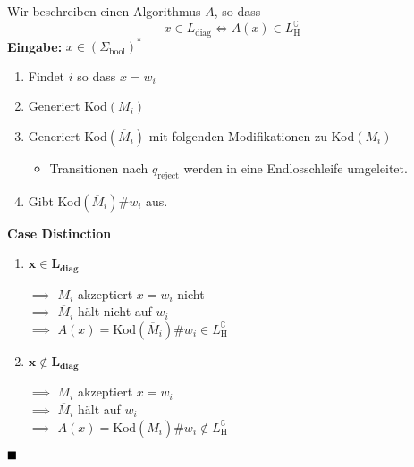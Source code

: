                 
                
                    Wir beschreiben einen Algorithmus $A$, so dass 
                    $$x \in L_{\text{diag}} \iff A(x) \in L_{\text{H}}^\complement$$
                    \textbf{Eingabe:} $x \in (\Sigma_{\text{bool}})^*$
                    
                    \begin{enumerate}[label=\arabic*.]
                        \item Findet $i$ so dass $x = w_i$
                        \item Generiert Kod$(M_i)$
                        \item Generiert Kod$(\overline{M}_i)$ mit folgenden Modifikationen zu Kod$(M_i)$
                        
                        \begin{itemize}[label=-]
                            \item Transitionen nach $q_{\text{reject}}$ werden in eine Endlosschleife umgeleitet.
                        \end{itemize}
                        \item Gibt Kod$(\overline{M}_i)\#w_i$ aus.
                    \end{enumerate}
            
                    \textbf{Case Distinction}
                    \begin{enumerate}[label=\Roman*.]
                        \item $\mathbf{x \in L_{\text{diag}}}$
                        \begin{center}
                            $\implies$ $M_i$ akzeptiert $x = w_i$ nicht\\
                            $\implies$ $\overline{M}_i$ hält nicht auf $w_i$\\
                            $\implies$  $A(x) = \text{Kod}(\overline{M}_i)\#w_i \in L_{\text{H}}^\complement$
                        \end{center}
                        
                        \item $\mathbf{x \notin L_{\text{diag}}}$
                        \begin{center}
                            $\implies$ $M_i$ akzeptiert $x = w_i$\\
                            $\implies$ $\overline{M}_i$ hält auf $w_i$\\
                            $\implies$  $A(x) = \text{Kod}(\overline{M}_i)\#w_i \notin L_{\text{H}}^\complement$
                        \end{center}
                    \end{enumerate}
                    $\hfill\blacksquare$

